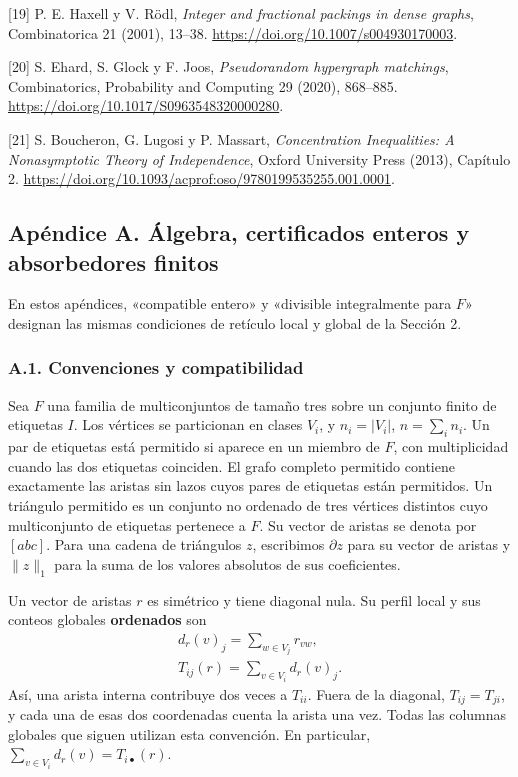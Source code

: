 \documentclass[spanish,11pt,a4paper]{article}
\begin{document}
{[}19{]} P. E. Haxell y V. Rödl, \emph{Integer and fractional packings in dense graphs}, Combinatorica 21 (2001), 13--38. \url{https://doi.org/10.1007/s004930170003}.

{[}20{]} S. Ehard, S. Glock y F. Joos, \emph{Pseudorandom hypergraph matchings}, Combinatorics, Probability and Computing 29 (2020), 868--885. \url{https://doi.org/10.1017/S0963548320000280}.

{[}21{]} S. Boucheron, G. Lugosi y P. Massart, \emph{Concentration Inequalities: A Nonasymptotic Theory of Independence}, Oxford University Press (2013), Capítulo 2. \url{https://doi.org/10.1093/acprof:oso/9780199535255.001.0001}.

\endgroup
\clearpage

\subsection{Apéndice A. Álgebra, certificados enteros y absorbedores finitos}\label{apuxe9ndice-a.-uxe1lgebra-certificados-enteros-y-absorbedores-finitos}

En estos apéndices, «compatible entero» y «divisible integralmente para \(F\)» designan las mismas condiciones de retículo local y global de la Sección 2.

\subsubsection{A.1. Convenciones y compatibilidad}\label{a.1.-convenciones-y-compatibilidad}

Sea \(F\) una familia de multiconjuntos de tamaño tres sobre un conjunto finito de etiquetas \(I\). Los vértices se particionan en clases \(V_i\), y \(n_i=|V_i|\), \(n=\sum_i n_i\). Un par de etiquetas está permitido si aparece en un miembro de \(F\), con multiplicidad cuando las dos etiquetas coinciden. El grafo completo permitido contiene exactamente las aristas sin lazos cuyos pares de etiquetas están permitidos. Un triángulo permitido es un conjunto no ordenado de tres vértices distintos cuyo multiconjunto de etiquetas pertenece a \(F\). Su vector de aristas se denota por \([abc]\). Para una cadena de triángulos \(z\), escribimos \(\partial z\) para su vector de aristas y \(\|z\|_1\) para la suma de los valores absolutos de sus coeficientes.

Un vector de aristas \(r\) es simétrico y tiene diagonal nula. Su perfil local y sus conteos globales \textbf{ordenados} son \[\begin{gathered}
d_r(v)_j=\sum_{w\in V_j}r_{vw},\\
T_{ij}(r)=\sum_{v\in V_i}d_r(v)_j.
\end{gathered}\] Así, una arista interna contribuye dos veces a \(T_{ii}\). Fuera de la diagonal, \(T_{ij}=T_{ji}\), y cada una de esas dos coordenadas cuenta la arista una vez. Todas las columnas globales que siguen utilizan esta convención. En particular, \(\sum_{v\in V_i}d_r(v)=T_{i\bullet}(r)\).
\end{document}
